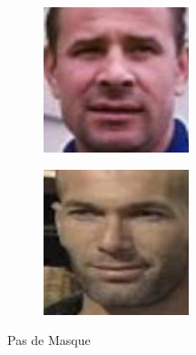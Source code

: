 \documentclass{cubeamer}
\begin{document}
\begin{frame}
\begin{minipage}{.49\textwidth}
\begin{figure}
	\begin{subfigure}{.45\textwidth}
		\centering
		\includegraphics[width=.8\linewidth]{img/pm3.jpg}  
	\end{subfigure}
	\begin{subfigure}{.45\textwidth}
		\centering
		\includegraphics[width=.8\linewidth]{img/pm4.jpg}  
	\end{subfigure}
	\caption{Pas de Masque}
\end{figure}
\end{minipage}
\begin{minipage}{.49\textwidth}
	

\end{minipage}
\end{frame}
\end{document}
